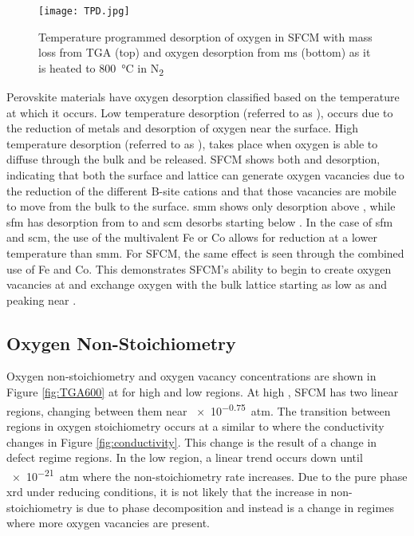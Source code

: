     \begin{figure}
      \texttt{[image: TPD.jpg]}
      \caption{Temperature programmed desorption of oxygen in SFCM with mass loss from TGA (top) and oxygen desorption from \gls{ms} (bottom) as it is heated to \SI{800}{\celsius} in N\textsubscript{2}}
      \label{fig:TPD}
    \end{figure}

    Perovskite materials have oxygen desorption classified based on the temperature at which it occurs.
    Low temperature desorption (referred to as \textalpha{}), occurs due to the reduction of metals and desorption of oxygen near the surface.
    High temperature desorption (referred to as \textbeta{}), takes place when oxygen is able to diffuse through the bulk and be released.\cite{Levasseur2009}
    SFCM shows both \textalpha{} and \textbeta{} desorption, indicating that both the surface and lattice can generate oxygen vacancies due to the reduction of the different B-site cations and that those vacancies are mobile to move from the bulk to the surface.
    \gls{smm} shows only \textbeta{} desorption above , while \gls{sfm} has \textalpha{} desorption from  to  and \gls{scm} desorbs starting below .\cite{Liu2011, Vasala2010}
    In the case of \gls{sfm} and \gls{scm}, the use of the multivalent Fe or Co allows for reduction at a lower temperature than \gls{smm}.
    For SFCM, the same effect is seen through the combined use of Fe and Co.
    This demonstrates SFCM's ability to begin to create oxygen vacancies at  and exchange oxygen with the bulk lattice starting as low as  and peaking near .

    \subsection{Oxygen Non-Stoichiometry}
    Oxygen non-stoichiometry and oxygen vacancy concentrations are shown in Figure \ref{fig:TGA600} at  for high and low  regions.
    At high , SFCM has two linear regions, changing between them near \SI{e-0.75}{atm}.
    The transition between regions in oxygen stoichiometry occurs at a similar  to where the conductivity changes in Figure \ref{fig:conductivity}.
    This change is the result of a change in defect regime regions.
    In the low  region, a linear trend occurs down until \SI{e-21}{atm} where the non-stoichiometry rate increases.
    Due to the pure phase \gls{xrd} under reducing conditions, it is not likely that the increase in non-stoichiometry is due to phase decomposition and instead is a change in regimes where more oxygen vacancies are present.

